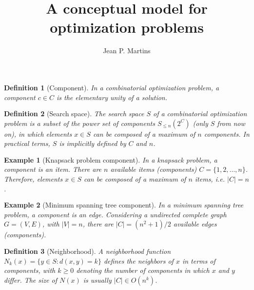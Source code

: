\documentclass[12pt,a4paper,onecolumn]{amsart}
\author{Jean P. Martins}
\title{A conceptual model for optimization problems}
\begin{document}
\begin{abstract}

\end{abstract}

\maketitle

\newtheorem{definition}{Definition}[section]
\newtheorem{example}{Example}[section]

\begin{definition}[Component]
In a combinatorial optimization problem, a component $c\in C$ is the elementary unity of a solution. 
\end{definition}

\begin{definition}[Search space]
The search space $S$ of a combinatorial optimization problem is a subset of the power set of components $S_{\leq n}(2^C)$ (only $S$ from now on), in which elements $x\in S$ can be composed of a maximum of $n$ components. In practical terms, $S$ is implicitly defined by $C$ and $n$.
\end{definition}

\begin{tcolorbox}
	\begin{example}[Knapsack problem component]
	In a knapsack problem, a component is an item. There are $n$ available items (components) $C=\{1,2,\dots,n\}$. Therefore, elements $x\in S$ can be composed of a maximum of $n$ items, i.e. $|C| = n$. 
	\end{example}
	
	\begin{example}[Minimum spanning tree component]
	In a minimum spanning tree problem, a component is an edge. Considering a undirected complete graph $G=(V,E)$, with $|V|=n$, there are $|C| = {(n^2 +1)}/{2}$ available edges (components). 
	\end{example}
\end{tcolorbox}

\begin{definition}[Neighborhood]
A neighborhood function $N_{k}(x) = \{y\in S : d(x,y) = k\}$ defines the neighbors of $x$ in terms of components, with $k\geq 0$ denoting the number of components in which $x$ and $y$ differ. The size of $N(x)$ is usually $|C|\in O(n^k)$.
\end{definition}
\end{document}
